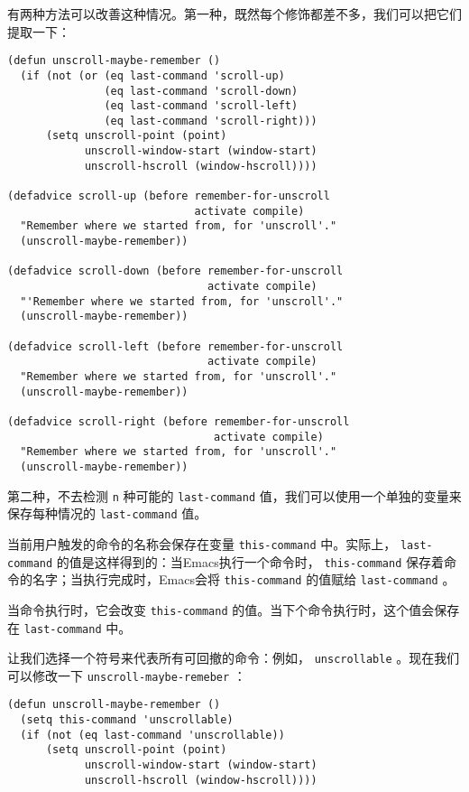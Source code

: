有两种方法可以改善这种情况。第一种，既然每个修饰都差不多，我们可以把它们提取一下：

\begin{verbatim}
(defun unscroll-maybe-remember ()
  (if (not (or (eq last-command 'scroll-up)
               (eq last-command 'scroll-down)
               (eq last-command 'scroll-left)
               (eq last-command 'scroll-right)))
      (setq unscroll-point (point)
            unscroll-window-start (window-start)
            unscroll-hscroll (window-hscroll))))

(defadvice scroll-up (before remember-for-unscroll
                             activate compile)
  "Remember where we started from, for 'unscroll'."
  (unscroll-maybe-remember))

(defadvice scroll-down (before remember-for-unscroll
                               activate compile)
  "'Remember where we started from, for 'unscroll'."
  (unscroll-maybe-remember))

(defadvice scroll-left (before remember-for-unscroll
                               activate compile)
  "Remember where we started from, for 'unscroll'."
  (unscroll-maybe-remember))

(defadvice scroll-right (before remember-for-unscroll
                                activate compile)
  "Remember where we started from, for 'unscroll'."
  (unscroll-maybe-remember))
\end{verbatim}

第二种，不去检测 \texttt{n} 种可能的 \texttt{last-command} 值，我们可以使用一个单独的变量来保存每种情况的 \texttt{last-command} 值。

当前用户触发的命令的名称会保存在变量 \texttt{this-command} 中。实际上， \texttt{last-command} 的值是这样得到的：当Emacs执行一个命令时， \texttt{this-command} 保存着命令的名字；当执行完成时，Emacs会将 \texttt{this-command} 的值赋给 \texttt{last-command} 。

当命令执行时，它会改变 \texttt{this-command} 的值。当下个命令执行时，这个值会保存在 \texttt{last-command} 中。

让我们选择一个符号来代表所有可回撤的命令：例如， \texttt{unscrollable} 。现在我们可以修改一下 \texttt{unscroll-maybe-remeber} ：

\begin{verbatim}
(defun unscroll-maybe-remember ()
  (setq this-command 'unscrollable)
  (if (not (eq last-command 'unscrollable))
      (setq unscroll-point (point)
            unscroll-window-start (window-start)
            unscroll-hscroll (window-hscroll))))
\end{verbatim}

